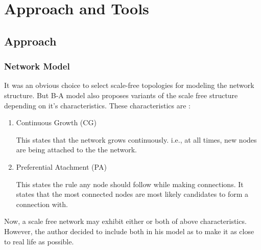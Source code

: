
\chapter{Approach and Tools} %

\label{Chapter2} %



\section{Approach}


\subsection{Network Model}
It was an obvious choice to select scale-free topologies for modeling the network structure.  But B-A model also proposes variants of the scale free structure depending on it's characteristics. These characteristics are : 

\begin{enumerate}
\item Continuous Growth (CG)

This states that the network grows continuously. i.e., at all times, new nodes are being attached to the the network.


\item Preferential Atachment (PA)

This states the rule any node should follow while making connections. It states that the most connected nodes are most likely candidates to form a connection with.


\end{enumerate} 

Now, a scale free network may exhibit either or both of above characteristics. However, the author decided to include both in his model as to make it as close to real life as possible. 

